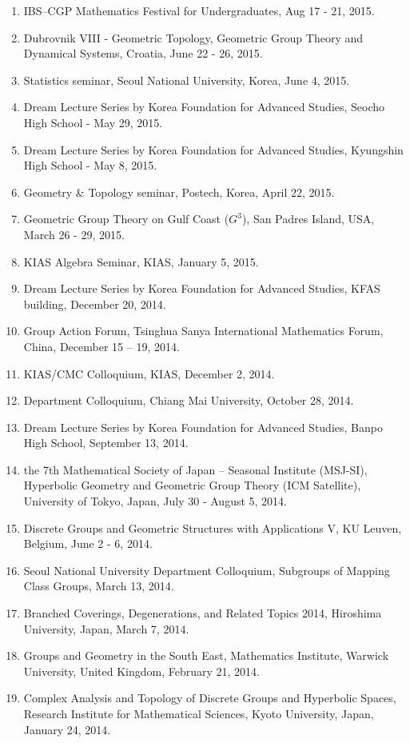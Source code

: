 \documentclass[11pt,a4paper]{article}
\begin{document}
\begin{enumerate}[leftmargin=1.5em, label=\arabic*.]
\item IBS--CGP Mathematics Festival for Undergraduates, Aug 17 - 21, 2015.
\item Dubrovnik VIII - Geometric Topology, Geometric Group Theory and Dynamical Systems, Croatia, June 22 - 26, 2015.
\item Statistics seminar, Seoul National University, Korea, June 4, 2015.
\item Dream Lecture Series by Korea Foundation for Advanced Studies, Seocho High School - May 29, 2015.
\item Dream Lecture Series by Korea Foundation for Advanced Studies, Kyungshin High School - May 8, 2015.
\item Geometry \& Topology seminar, Postech, Korea, April 22, 2015.
\item Geometric Group Theory on Gulf Coast ($G^3$), San Padres Island, USA, March 26 - 29, 2015.
\item KIAS Algebra Seminar, KIAS, January 5, 2015.
\item Dream Lecture Series by Korea Foundation for Advanced Studies, KFAS building, December 20, 2014.
\item Group Action Forum, Tsinghua Sanya International Mathematics Forum, China, December 15 -- 19, 2014.
\item KIAS/CMC Colloquium, KIAS, December 2, 2014.
\item Department Colloquium, Chiang Mai University, October 28, 2014.
\item Dream Lecture Series by Korea Foundation for Advanced Studies, Banpo High School, September 13, 2014.
\item the 7th Mathematical Society of Japan -- Seasonal Institute (MSJ-SI), Hyperbolic Geometry and Geometric Group Theory (ICM Satellite), University of Tokyo, Japan, July 30 - August 5, 2014.
\item Discrete Groups and Geometric Structures with Applications V, KU Leuven, Belgium, June 2 - 6, 2014.
\item Seoul National University Department Colloquium, Subgroups of Mapping Class Groups, March 13, 2014.
\item Branched Coverings, Degenerations, and Related Topics 2014, Hiroshima University, Japan, March 7, 2014.
\item Groups and Geometry in the South East, Mathematics Institute, Warwick University, United Kingdom, February 21, 2014.
\item Complex Analysis and Topology of Discrete Groups and Hyperbolic Spaces, Research Institute for Mathematical Sciences, Kyoto University, Japan, January 24, 2014.

\end{enumerate}
\end{document}
